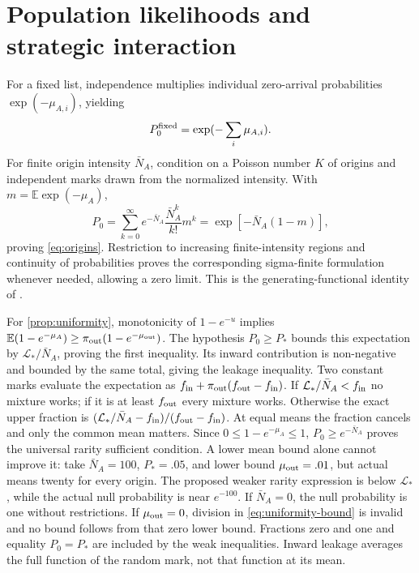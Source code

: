 \section{Population likelihoods and strategic interaction}
\label{app:population-proof}
For a fixed list, independence multiplies individual zero-arrival
probabilities $\exp(-\mu_{A,i})$, yielding
\begin{equation}
 P_0^{\rm fixed}=\exp(-\sum_i\mu_{A,i}).\label{eq:fixed}
\end{equation}
For finite origin intensity $\bar N_A$, condition on a Poisson number
$K$ of origins and independent marks drawn from the normalized intensity.
With $m=\mathbb E\exp(-\mu_A)$,
\[
 P_0=\sum_{k=0}^\infty e^{-\bar N_A}
 \frac{\bar N_A^k}{k!}m^k
 =\exp[-\bar N_A(1-m)],
\]
proving \cref{eq:origins}. Restriction to increasing finite-intensity
regions and continuity of probabilities proves the corresponding
sigma-finite formulation whenever needed, allowing a zero limit. This
is the generating-functional identity of \citet{LastPenrose2017}.

For \cref{prop:uniformity}, monotonicity of $1-e^{-u}$ implies
$\mathbb E(1-e^{-\mu_A})\geq\pi_{\rm out}(1-e^{-\mu_{\rm out}})$.
The hypothesis $P_0\geq P_*$ bounds this expectation by
$\mathcal L_*/\bar N_A$, proving the first inequality. Its inward contribution is
non-negative and bounded by the same total, giving the leakage
inequality. Two constant marks evaluate the expectation as
$f_{\rm in}+\pi_{\rm out}(f_{\rm out}-f_{\rm in})$.
If $\mathcal L_*/\bar N_A<f_{\rm in}$ no mixture works; if it is at least
$f_{\rm out}$ every mixture works. Otherwise the exact upper fraction
is $(\mathcal L_*/\bar N_A-f_{\rm in})/(f_{\rm out}-f_{\rm in})$.
At equal means the fraction cancels and only the common mean matters.
Since $0\leq1-e^{-\mu_A}\leq1$, $P_0\geq e^{-\bar N_A}$ proves the
universal rarity sufficient condition. A lower mean bound alone cannot
improve it: take $\bar N_A=100$, $P_*=.05$, and lower bound
$\mu_{\rm out}=.01$, but actual means twenty for every origin.
The proposed weaker rarity expression is below $\mathcal L_*$, while the actual
null probability is near $e^{-100}$. If $\bar N_A=0$, the null probability
is one without restrictions. If $\mu_{\rm out}=0$, division in
\cref{eq:uniformity-bound} is invalid and no bound follows from that
zero lower bound. Fractions zero and one and equality $P_0=P_*$ are
included by the weak inequalities. Inward leakage averages the full
function of the random mark, not that function at its mean.

